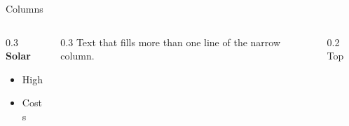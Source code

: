 \documentclass{beamer}
\begin{document}
\begin{frame}{Columns}
\begin{columns}[T]
\begin{column}{0.3\textwidth}
\textbf{Solar}
\begin{itemize}
\item High
\item Costs
\end{itemize}
\end{column}
\begin{column}{0.3\textwidth}
Text that fills more than one line of the narrow column.
\end{column}
\begin{column}[t]{0.2\textwidth}
Top
\end{column}
\end{columns}
\end{frame}
\end{document}
